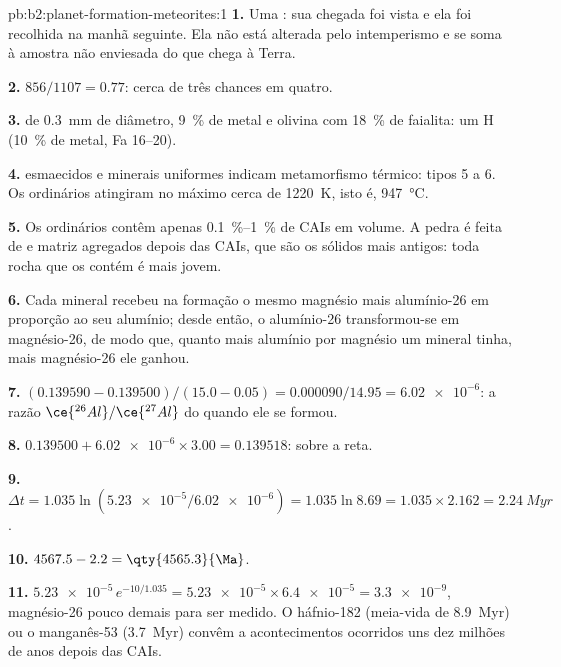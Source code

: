 \begin{solution}{pb:b2:planet-formation-meteorites:1}
\textbf{1.} Uma : sua chegada foi vista e ela foi recolhida na manhã seguinte.
Ela não está alterada pelo intemperismo e se soma à amostra não enviesada do que chega à Terra.

\textbf{2.} $856/1107 = 0.77$: cerca de três chances em quatro.

\textbf{3.}  de \qty{0.3}{mm} de diâmetro, \qty{9}{\percent} de metal e olivina com
\qty{18}{\percent} de faialita: um  H (\qty{10}{\percent} de metal, Fa 16--20).

\textbf{4.}  esmaecidos e minerais uniformes indicam metamorfismo térmico: tipos
5 a 6. Os  ordinários atingiram no máximo cerca de \qty{1220}{K}, isto é,
\qty{947}{\degreeCelsius}.

\textbf{5.} Os  ordinários contêm apenas \qtyrange{0.1}{1}{\percent} de CAIs em
volume. A pedra é feita de  e matriz agregados depois das CAIs, que
são os sólidos mais antigos: toda rocha que os contém é mais jovem.

\textbf{6.} Cada mineral recebeu na formação o mesmo magnésio mais alumínio-26
em proporção ao seu alumínio; desde então, o alumínio-26 transformou-se em
magnésio-26, de modo que, quanto mais alumínio por magnésio um mineral tinha, mais
magnésio-26 ele ganhou.

\textbf{7.} $(0.139590 - 0.139500)/(15.0 - 0.05) = \num{0.000090}/14.95 =
\num{6.02e-6}$: a razão $\ce{^{26}Al}/\ce{^{27}Al}$ do  quando ele
se formou.

\textbf{8.} $0.139500 + \num{6.02e-6}\times3.00 = 0.139518$: sobre a reta.

\textbf{9.} $\Delta t = 1.035\ln(\num{5.23e-5}/\num{6.02e-6}) = 1.035\ln8.69 =
1.035\times2.162 = \qty{2.24}{Myr}$.

\textbf{10.} $4567.5 - 2.2 = \qty{4565.3}{\Ma}$.

\textbf{11.} $\num{5.23e-5}\,e^{-10/1.035} = \num{5.23e-5}\times\num{6.4e-5} =
\num{3.3e-9}$, magnésio-26 pouco demais para ser medido. O háfnio-182 (meia-vida de
\qty{8.9}{Myr}) ou o manganês-53 (\qty{3.7}{Myr}) convêm a acontecimentos ocorridos uns dez milhões de anos
depois das CAIs.


\end{solution}
